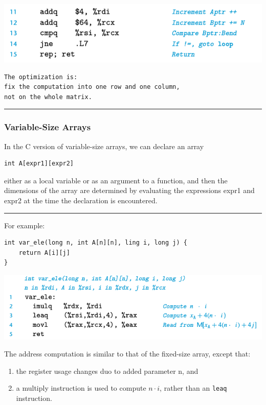 \documentclass[11pt]{article}
\begin{document}
\begin{center}
\includegraphics[width=.9\linewidth]{pics/fixed-array-assembly-code-2.png}
\end{center}

\begin{verbatim}
The optimization is:
fix the computation into one row and one column,
not on the whole matrix.
\end{verbatim}

\noindent\rule{\textwidth}{0.5pt}

\subsubsection{Variable-Size Arrays}
\label{sec:orgfc92253}
In the C version of variable-size arrays, we can declare an array\\
\begin{verbatim}
int A[expr1][expr2]
\end{verbatim}
either as a local variable or as an argument to a function, and then the dimensions of the array are determined by evaluating the expressions expr1 and expr2 at the time the declaration is encountered.\\

\noindent\rule{\textwidth}{0.5pt}
For example:\\
\begin{verbatim}
int var_ele(long n, int A[n][n], ling i, long j) {
    return A[i][j]
}
\end{verbatim}

\begin{center}
\includegraphics[width=.9\linewidth]{pics/variable-sized-array-assembly-code.png}
\end{center}

The address computation is similar to that of the fixed-size array, except that:\\
\begin{enumerate}
\item the register usage changes duo to added parameter n, and\\
\item a multiply instruction is used to compute \(n\cdot i\), rather than an \texttt{leaq} instruction.\\
\end{enumerate}
\end{document}
